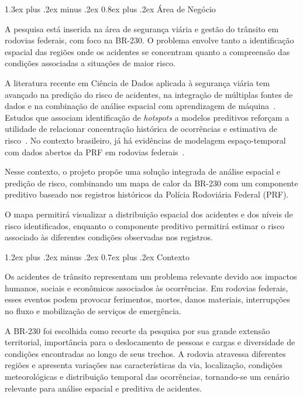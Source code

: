\documentclass[11pt,a4paper]{article}
\makeatletter
\renewcommand\section{
\@startsection{section}{1}{0pt}%
{1.3ex plus .2ex minus .2ex}%
{0.8ex plus .2ex}%
{\normalfont\Large\bfseries}
}
\renewcommand\subsection{
\@startsection{subsection}{2}{0pt}%
{1.2ex plus .2ex minus .2ex}%
{0.7ex plus .2ex}%
{\normalfont\large\bfseries}
}
\makeatother
\begin{document}
\newpage


\section{Área de Negócio}

A pesquisa está inserida na área de segurança viária e gestão do trânsito em rodovias federais, com foco na BR-230. O problema envolve tanto a identificação espacial das regiões onde os acidentes se concentram quanto a compreensão das condições associadas a situações de maior risco.

A literatura recente em Ciência de Dados aplicada à segurança viária tem avançado na predição do risco de acidentes, na integração de múltiplas fontes de dados e na combinação de análise espacial com aprendizagem de máquina~\cite{behboudi2024,affou2026,he2025}. Estudos que associam identificação de \textit{hotspots} a modelos preditivos reforçam a utilidade de relacionar concentração histórica de ocorrências e estimativa de risco~\cite{santos2021,khan2024,le2020}. No contexto brasileiro, já há evidências de modelagem espaço-temporal com dados abertos da PRF em rodovias federais~\cite{tozetto2025}.

Nesse contexto, o projeto propõe uma solução integrada de análise espacial e predição de risco, combinando um mapa de calor da BR-230 com um componente preditivo baseado nos registros históricos da Polícia Rodoviária Federal (PRF).

O mapa permitirá visualizar a distribuição espacial dos acidentes e dos níveis de risco identificados, enquanto o componente preditivo permitirá estimar o risco associado às diferentes condições observadas nos registros.

\subsection{Contexto}

Os acidentes de trânsito representam um problema relevante devido aos impactos humanos, sociais e econômicos associados às ocorrências. Em rodovias federais, esses eventos podem provocar ferimentos, mortes, danos materiais, interrupções no fluxo e mobilização de serviços de emergência.

A BR-230 foi escolhida como recorte da pesquisa por sua grande extensão territorial, importância para o deslocamento de pessoas e cargas e diversidade de condições encontradas ao longo de seus trechos. A rodovia atravessa diferentes regiões e apresenta variações nas características da via, localização, condições meteorológicas e distribuição temporal das ocorrências, tornando-se um cenário relevante para análise espacial e preditiva de acidentes.
\end{document}
